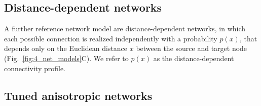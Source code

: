 








\subsection*{Distance-dependent networks}

A further reference network model are distance-dependent networks, in which each possible connection is realized independently with a probability $p(x)$, that depends only on the Euclidean distance $x$ between the source and target node (Fig.~\ref{fig:4_net_models}C). We refer to $p(x)$ as the distance-dependent connectivity profile.


\subsection*{Tuned anisotropic networks}




